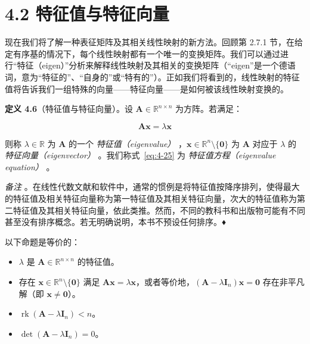 \section*{4.2 特征值与特征向量}
\label{sec:4.2}

现在我们将了解一种表征矩阵及其相关线性映射的新方法。回顾第 2.7.1 节，在给定有序基的情况下，每个线性映射都有一个唯一的变换矩阵。我们可以通过进行“特征（eigen）”分析来解释线性映射及其相关的变换矩阵（“eigen”是一个德语词，意为“特征的”、“自身的”或“特有的”）。正如我们将看到的，线性映射的特征值将告诉我们一组特殊的向量——特征向量——是如何被该线性映射变换的。

\textbf{定义 4.6}（特征值与特征向量）。设 $ \boldsymbol{A} \in \mathbb{R}^{n \times n} $ 为方阵。若满足：

\begin{equation}
\boldsymbol{A} \boldsymbol{x} = \lambda \boldsymbol{x}
\tag{4.25}\label{eq:4-25}
\end{equation}

则称 $ \lambda \in \mathbb{R} $ 为 $ \boldsymbol{A} $ 的一个 \emph{特征值（eigenvalue）} ，$ \boldsymbol{x} \in \mathbb{R}^n \setminus \{\boldsymbol{0}\} $ 为 $ \boldsymbol{A} $ 对应于 $ \lambda $ 的 \emph{特征向量（eigenvector）} 。我们称式~\eqref{eq:4-25} 为 \emph{特征值方程（eigenvalue equation）} 。

\emph{备注} 。在线性代数文献和软件中，通常的惯例是将特征值按降序排列，使得最大的特征值及相关特征向量称为第一特征值及其相关特征向量，次大的特征值称为第二特征值及其相关特征向量，依此类推。然而，不同的教科书和出版物可能有不同甚至没有排序概念。若无明确说明，本书不预设任何排序。♦

以下命题是等价的：

\begin{itemize}
\item $ \lambda $ 是 $ \boldsymbol{A} \in \mathbb{R}^{n \times n} $ 的特征值。
\item 存在 $ \boldsymbol{x} \in \mathbb{R}^n \setminus \{\boldsymbol{0}\} $ 满足 $ \boldsymbol{A} \boldsymbol{x} = \lambda \boldsymbol{x} $，或者等价地，$ (\boldsymbol{A} - \lambda \boldsymbol{I}_n)\boldsymbol{x} = \boldsymbol{0} $ 存在非平凡解（即 $ \boldsymbol{x} \neq \boldsymbol{0} $）。
\item $ \operatorname{rk}(\boldsymbol{A} - \lambda \boldsymbol{I}_n) < n $。
\item $ \det(\boldsymbol{A} - \lambda \boldsymbol{I}_n) = 0 $。
\end{itemize}

